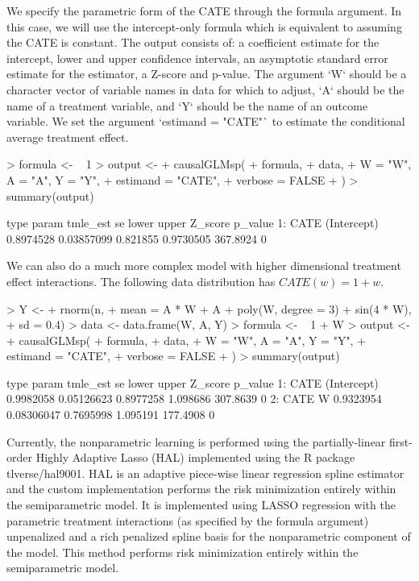 \documentclass{article}
\begin{document}
We specify the parametric form of the CATE through the formula argument. In this case, we will use the intercept-only formula which is equivalent to assuming the CATE is constant.  The output consists of:
a coefficient estimate for the intercept, lower and upper confidence intervals, an asymptotic standard error estimate for the estimator, a Z-score and p-value. The argument `W` should be a character vector of variable names in data for which to adjust, `A` should be the name of a treatment variable, and `Y` should be the name of an outcome variable. We set the argument `estimand = "CATE"` to estimate the conditional average treatment effect.
\begin{Schunk}
\begin{Sinput}
> formula <- ~ 1
> output <-
+   causalGLMsp(
+     formula,
+     data,
+     W = "W", A = "A", Y = "Y",
+     estimand = "CATE",
+     verbose = FALSE
+   )
> summary(output) 
\end{Sinput}
\begin{Soutput}
   type       param  tmle_est         se    lower     upper  Z_score p_value
1: CATE (Intercept) 0.8974528 0.03857099 0.821855 0.9730505 367.8924       0
\end{Soutput}
\end{Schunk}
We can also do a much more complex model with higher dimensional treatment effect interactions. The following data distribution has $CATE(w) = 1 + w$.  
\begin{Schunk}
\begin{Sinput}
> Y <-
+   rnorm(n,
+         mean = A * W + A + poly(W, degree = 3) + sin(4 * W),
+         sd = 0.4)
> data <- data.frame(W, A, Y)
> formula <- ~ 1 + W
> output <-
+   causalGLMsp(
+     formula,
+     data,
+     W = "W", A = "A", Y = "Y",
+     estimand = "CATE",
+     verbose = FALSE
+   )
> summary(output) 
\end{Sinput}
\begin{Soutput}
   type       param  tmle_est         se     lower    upper  Z_score p_value
1: CATE (Intercept) 0.9982058 0.05126623 0.8977258 1.098686 307.8639       0
2: CATE           W 0.9323954 0.08306047 0.7695998 1.095191 177.4908       0
\end{Soutput}
\end{Schunk}


Currently, the nonparametric learning is performed using the partially-linear first-order Highly Adaptive Lasso (HAL) implemented using the R package tlverse/hal9001. HAL is an adaptive piece-wise linear regression spline estimator and the custom implementation performs the risk minimization entirely within the semiparametric model. It is implemented using LASSO regression with the parametric treatment interactions (as specified by the formula argument) unpenalized and a rich penalized spline basis for the nonparametric component of the model. This method performs risk minimization entirely within the semiparametric model.
\end{document}
